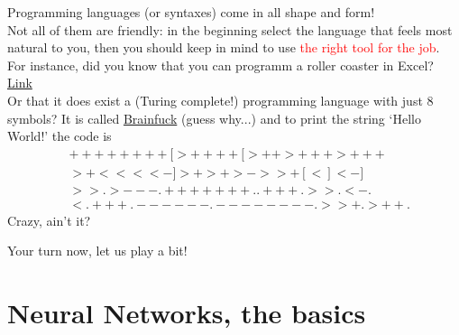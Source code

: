 \documentclass[10pt]{beamer}
\newcommand{\red}[1]{\textcolor{red}{#1}}
\renewcommand{\[}{\begin{equation*}}
\renewcommand{\]}{\end{equation*}}
\begin{document}
\begin{frame}
Programming languages (or syntaxes) come in all shape and form!\\
Not all of them are friendly: in the beginning select the language that feels most natural to you, then you should keep in mind to use \red{the right tool for the job}.\\
For instance, did you know that you can programm a roller coaster in Excel? \href{https://www.youtube.com/watch?v=IrVA1BBHFHw}{Link}\\
Or that it does exist a (Turing complete!) programming language with just 8 symbols? It is called \href{https://en.wikipedia.org/wiki/Brainfuck}{Brainfuck} (guess why...) and to print the string `Hello World!' the code is 
\[\begin{split}
& ++++++++[>++++[>++>+++>+++\\
& >+<<<<-]>+>+>->>+[<]<-]\\
& >>.>---.+++++++..+++.>>.<-.\\
& <.+++.------.--------.>>+.>++.
\end{split}\]
Crazy, ain't it?
\end{frame}

\begin{frame}
Your turn now, let us play a bit!
\end{frame}

\section{Neural Networks, the basics}



\end{document}
